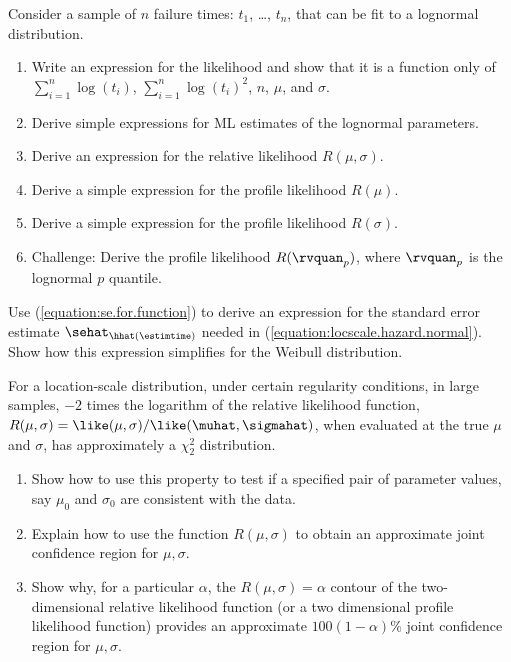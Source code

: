 \begin{exercise1}
\label{exercise:from.me95}
Consider a sample of $n$ failure times:
$t_{1}$, \ldots, $t_{n}$, that can be fit to a lognormal distribution.
\begin{enumerate}
\item
Write an expression for the likelihood and show that it is a function
only of $\sum_{i=1}^{n}\log(t_{i})$, $\sum_{i=1}^{n}\log(t_{i})^2$, 
$n$, $\mu$, and $\sigma$.
\item
Derive simple expressions for ML estimates of the lognormal
parameters.
\item
Derive an expression for the relative likelihood $R(\mu,\sigma)$.
\item
Derive a simple expression for the profile likelihood $R(\mu)$.
\item
Derive a simple expression for the profile likelihood $R(\sigma)$.
\item
Challenge: Derive the profile likelihood
$R(\rvquan_{p})$, where $\rvquan_{p}$ is the lognormal $p$ quantile.
\end{enumerate}
\end{exercise1}


\begin{exercise1}
Use (\ref{equation:se.for.function}) to derive an expression for
the standard error estimate $\sehat_{\hhat(\estimtime)}$
needed in (\ref{equation:locscale.hazard.normal}). Show how this
expression simplifies for the Weibull distribution.
\end{exercise1}

\begin{exercise1}
For a location-scale distribution, under certain regularity
conditions, in large samples, $-2$ times the logarithm of the relative
likelihood function,
$R(\mu,\sigma)=\like(\mu,\sigma)/\like(\muhat,\sigmahat)$, when
evaluated at the true $\mu$ and $\sigma$, has approximately a
$\chi^{2}_{2}$ distribution.
\begin{enumerate}
\item
Show how to use this property to test if a specified pair of parameter
values, say $\mu_{0}$ and $\sigma_{0}$ are consistent with the data.
\item
Explain how to use the function $R(\mu,\sigma)$ to obtain an
approximate joint confidence region for $\mu,\sigma$.
\item
Show why, for a particular $\alpha$, the $R(\mu,\sigma)= \alpha$
contour of the two-dimensional relative likelihood function (or a two
dimensional profile likelihood function) provides an approximate
$100(1-\alpha)\%$ joint confidence region for $\mu,\sigma$.
\end{enumerate}
\end{exercise1}


